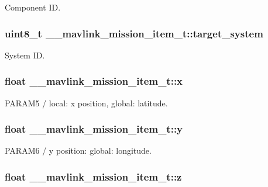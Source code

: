 Component I\+D. 

\hypertarget{struct____mavlink__mission__item__t_ab6e5076aa5f0e524e88879bebf0ed483}{
\subsubsection[{target\+\_\+system}]{\setlength{\rightskip}{0pt plus 5cm}uint8\+\_\+t \+\_\+\+\_\+mavlink\+\_\+mission\+\_\+item\+\_\+t\+::target\+\_\+system}}\label{struct____mavlink__mission__item__t_ab6e5076aa5f0e524e88879bebf0ed483}


System I\+D. 

\hypertarget{struct____mavlink__mission__item__t_a578c43dbf85decd47437180c89407f93}{
\subsubsection[{x}]{\setlength{\rightskip}{0pt plus 5cm}float \+\_\+\+\_\+mavlink\+\_\+mission\+\_\+item\+\_\+t\+::x}}\label{struct____mavlink__mission__item__t_a578c43dbf85decd47437180c89407f93}


P\+A\+R\+A\+M5 / local\+: x position, global\+: latitude. 

\hypertarget{struct____mavlink__mission__item__t_a916e8ea61a94ce7b854ebd11cc5eea37}{
\subsubsection[{y}]{\setlength{\rightskip}{0pt plus 5cm}float \+\_\+\+\_\+mavlink\+\_\+mission\+\_\+item\+\_\+t\+::y}}\label{struct____mavlink__mission__item__t_a916e8ea61a94ce7b854ebd11cc5eea37}


P\+A\+R\+A\+M6 / y position\+: global\+: longitude. 

\hypertarget{struct____mavlink__mission__item__t_adfa6844101b755c5e439b46f21ba0be8}{
\subsubsection[{z}]{\setlength{\rightskip}{0pt plus 5cm}float \+\_\+\+\_\+mavlink\+\_\+mission\+\_\+item\+\_\+t\+::z}}\label{struct____mavlink__mission__item__t_adfa6844101b755c5e439b46f21ba0be8}


